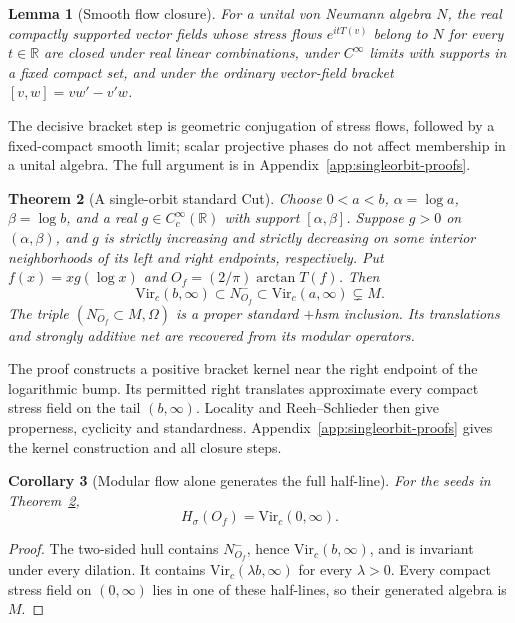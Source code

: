 \documentclass[12pt]{article}
\newtheorem{theorem}{Theorem}[section]
\newtheorem{lemma}[theorem]{Lemma}
\newtheorem{corollary}[theorem]{Corollary}
\theoremstyle{definition}
\theoremstyle{remark}
\begin{document}
\begin{lemma}[Smooth flow closure]\label{lem:flowclosure}
For a unital von Neumann algebra \(N\), the real compactly supported vector
fields whose stress flows \(e^{itT(v)}\) belong to \(N\) for every \(t\in\mathbb R\)
are closed under real linear combinations, under \(C^\infty\) limits with
supports in a fixed compact set, and under the ordinary vector-field bracket
\([v,w]=vw'-v'w\).
\end{lemma}
The decisive bracket step is geometric conjugation of stress flows,
followed by a fixed-compact smooth limit; scalar projective phases do
not affect membership in a unital algebra. The full argument is in
Appendix~\ref{app:singleorbit-proofs}.


\begin{theorem}[A single-orbit standard Cut]\label{thm:singleorbit}
Choose \(0<a<b\), \(\alpha=\log a\), \(\beta=\log b\), and a real
\(g\in C_c^\infty(\mathbb R)\) with support \([\alpha,\beta]\).
Suppose \(g>0\) on \((\alpha,\beta)\), and \(g\) is strictly increasing and
strictly decreasing on some interior neighborhoods of its left and right
endpoints, respectively. Put \(f(x)=xg(\log x)\) and
\(O_f=(2/\pi)\arctan T(f)\). Then
\begin{equation}\label{eq:singleorbit}
 \mathrm{Vir}_c(b,\infty)\subset N^-_{O_f}
 \subset\mathrm{Vir}_c(a,\infty)\subsetneq M .
\end{equation}
The triple \((N^-_{O_f}\subset M,\Omega)\) is a proper standard \(+\)hsm
inclusion. Its translations and strongly additive net are recovered from its
modular operators.
\end{theorem}
The proof constructs a positive bracket kernel near the right
endpoint of the logarithmic bump. Its permitted right translates
approximate every compact stress field on the tail \((b,\infty)\).
Locality and Reeh--Schlieder then give properness, cyclicity and
standardness. Appendix~\ref{app:singleorbit-proofs} gives the kernel
construction and all closure steps.


\begin{corollary}[Modular flow alone generates the full half-line]\label{cor:modonly}
For the seeds in Theorem~\ref{thm:singleorbit},
\[
 H_\sigma(O_f)=\mathrm{Vir}_c(0,\infty).
\]
\end{corollary}
\begin{proof}
The two-sided hull contains \(N^-_{O_f}\), hence
\(\mathrm{Vir}_c(b,\infty)\), and is invariant under every dilation. It contains
\(\mathrm{Vir}_c(\lambda b,\infty)\) for every \(\lambda>0\).
Every compact stress field on \((0,\infty)\) lies in one of these half-lines,
so their generated algebra is \(M\).
\end{proof}
\end{document}
